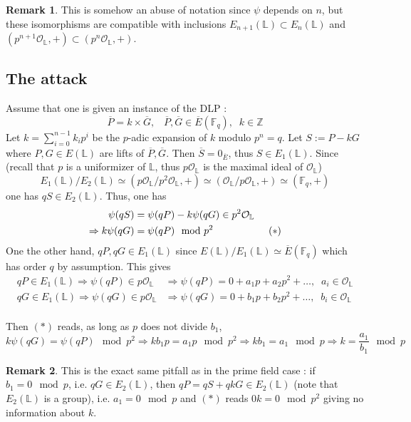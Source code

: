 \documentclass[10pt]{article}
\theoremstyle{definition}
\newtheorem{remark}{Remark}
\newcommand{\F}{\mathbb{F}}
\renewcommand{\L}{\mathbb{L}}
\newcommand{\Z}{\mathbb{Z}}
\begin{document}
\begin{remark}
This is somehow an abuse of notation since $\psi$ depends on $n$, but these isomorphisms are compatible with inclusions $E_{n+1}(\L) \subset E_n(\L)$ and $(p^{n+1}\mathcal{O}_{\L},+) \subset (p^n\mathcal{O}_{\L},+)$. 
\end{remark}

\subsection{The attack}

\noindent Assume that one is given an instance of the DLP : 
\[ \overline{P} = k \times \overline{G}, \; \; \;  \overline{P}, \overline{G} \in \overline{E}(\F_q), \; \; k \in \Z \]
Let $k = \sum_{i = 0}^{n-1} k_i p^i$ be the $p$-adic expansion of $k$ modulo $p^n = q$.
Let $S := P-kG$ where $P,G \in E(\L)$ are lifts of $\overline{P},\overline{G}$.
Then $\overline{S} = 0_{\overline{E}}$, thus $S \in E_1(\L)$.
Since (recall that $p$ is a uniformizer of $\L$, thus $p\mathcal{O}_{\L}$ is the maximal ideal of $\mathcal{O}_{\L}$)
\[E_1(\L) /E_2(\L) \simeq (p\mathcal{O}_{\L}/ p^2\mathcal{O}_{\L},+) \simeq (\mathcal{O}_{\L}/p\mathcal{O}_{\L},+) \simeq (\F_q,+)\]
one has $qS \in E_2(\L)$.
Thus, one has
\begin{align*} \psi(qS) &=     \psi(qP) - k  \psi(qG) \in p^2\mathcal{O}_{\L} \\
 \Rightarrow k\psi(qG) &= \psi(qP) \mod p^2  \mkern100mu(*) \end{align*}
One the other hand, $qP, qG \in E_1(\L)$ since $E(\L) / E_1(\L) \simeq \overline{E}(\F_q)$ which has order $q$ by assumption.
This gives 
\begin{align*}
qP \in E_1(\L) \Rightarrow \psi(qP) \in p\mathcal{O}_{\L} &\Rightarrow \psi(qP) = 0 + a_1p+ a_2p^2+ \dots, \; \; a_i \in \mathcal{O}_{\L} \\
qG \in E_1(\L) \Rightarrow \psi(qG) \in p\mathcal{O}_{\L} &\Rightarrow \psi(qG) = 0 + b_1p+ b_2p^2+ \dots, \; \; b_i \in \mathcal{O}_{\L} \\
\end{align*}

\noindent Then $(*)$ reads, as long as $p$ does not divide $b_1$,
\[ k\psi(qG) = \psi(qP) \mod p^2 \Rightarrow kb_1p = a_1p \mod p^2 \Rightarrow kb_1 = a_1 \mod p \Rightarrow k = \frac{a_1}{b_1} \mod p \]

\begin{remark}
This is the exact same pitfall as in the prime field case : if $b_1 = 0 \mod p$, i.e. $qG \in E_2(\L)$, then $qP = qS + qkG \in E_2(\L)$ (note that $E_2(\L)$ is a group), i.e. $a_1 = 0 \mod p$ and $(*)$ reads $0k = 0 \mod p^2$ giving no information about $k$.
\end{remark}
\end{document}
